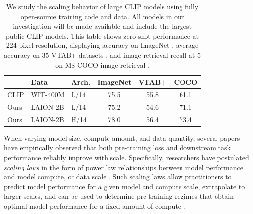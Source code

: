 \documentclass[11pt,table]{article}
\newcommand{\citep}{\cite}
\begin{document}
\begin{table}[t!]
\setlength\tabcolsep{3.0pt}
    \centering
    \small
    \begin{tabular}{lllccc}\toprule
      & Data & Arch. & ImageNet & VTAB+ & COCO  \\\midrule
    CLIP \cite{radford2021learning} & WIT-400M & L/14 & 75.5  & 55.8  & 61.1\\
    Ours & LAION-2B & L/14 & 75.2 &  54.6	 & 71.1 \\
    Ours & LAION-2B & H/14 & \underline{78.0} & \underline{56.4} & \underline{73.4} \\\bottomrule
    \end{tabular}
    \caption{
    We study the scaling behavior of large CLIP models using fully open-source training code and data.
    All models in our investigation will be made available and include the largest public CLIP models.
    This table shows zero-shot performance at 224 pixel resolution, displaying accuracy on ImageNet \cite{Deng2009a}, average accuracy on 35 VTAB+ datasets \cite{Schuhmann2022,zhai2019large}, and image retrieval recall at 5 on MS-COCO image retrieval \cite{lin2014microsoft}.
    \vspace{-1em}
    }
    \label{tab:best_perf}
\end{table}

When varying model size, compute amount, and data quantity, several papers have empirically observed that both pre-training loss and downstream task performance reliably improve with scale.
Specifically, researchers have postulated \emph{scaling laws} in the form of power law relationships between model performance and model compute, or data scale \citep{Kaplan2020,tay2021scale,Riquelme2021,Zhai2022scaling}. %
Such scaling laws allow practitioners to predict model performance for a given model and compute scale, extrapolate to larger scales, and can be used to determine pre-training regimes that obtain optimal model performance for a fixed amount of compute \citep{Kaplan2020,hoffmann2022training}.
\end{document}
